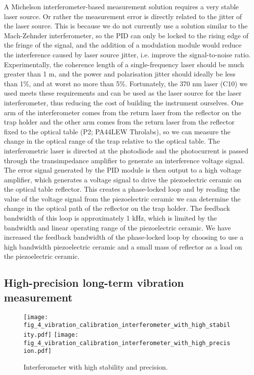 A Michelson interferometer-based measurement solution requires a very stable laser source. Or rather the measurement error is directly related to the jitter of the laser source. This is because we do not currently use a solution similar to the Mach-Zehnder interferometer, so the PID can only be locked to the rising edge of the fringe of the signal, and the addition of a modulation module would reduce the interference caused by laser source jitter, i.e. improve the signal-to-noise ratio. Experimentally, the coherence length of a single-frequency laser should be much greater than 1 m, and the power and polarisation jitter should ideally be less than 1\%, and at worst no more than 5\%. Fortunately, the 370 nm laser (C10) we used meets these requirements and can be used as the laser source for the laser interferometer, thus reducing the cost of building the instrument ourselves. One arm of the interferometer comes from the return laser from the reflector on the trap holder and the other arm comes from the return laser from the reflector fixed to the optical table (P2; PA44LEW Throlabs), so we can measure the change in the optical range of the trap relative to the optical table. The interferometric laser is directed at the photodiode and the photocurrent is passed through the transimpedance amplifier to generate an interference voltage signal. The error signal generated by the PID module is then output to a high voltage amplifier, which generates a voltage signal to drive the piezoelectric ceramic on the optical table reflector. This creates a phase-locked loop and by reading the value of the voltage signal from the piezoelectric ceramic we can determine the change in the optical path of the reflector on the trap holder. The feedback bandwidth of this loop is approximately 1 kHz, which is limited by the bandwidth and linear operating range of the piezoelectric ceramic. We have increased the feedback bandwidth of the phase-locked loop by choosing to use a high bandwidth piezoelectric ceramic and a small mass of reflector as a load on the piezoelectric ceramic.

\subsection{High-precision long-term vibration measurement}

\begin{figure}
    \centering
    {\texttt{[image: fig\_4\_vibration\_calibration\_interferometer\_with\_high\_stability.pdf]}}
    {\texttt{[image: fig\_4\_vibration\_calibration\_interferometer\_with\_high\_precision.pdf]}}
    \caption{Interferometer with high stability and precision.}
    \label{fig:fig_4_vibration_calibration_interferometer}
\end{figure}

